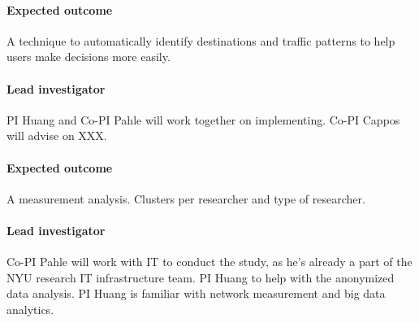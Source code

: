 \paragraph{Expected outcome} A technique to automatically identify destinations and traffic patterns to help users make decisions more easily.

\paragraph{Lead investigator} PI Huang and Co-PI Pahle will work together on implementing. Co-PI Cappos will advise on XXX.



\paragraph{Expected outcome} A measurement analysis. Clusters per researcher and type of researcher.

\paragraph{Lead investigator} Co-PI Pahle will work with IT to conduct the study, as he's already a part of the NYU research IT infrastructure team. PI Huang to help with the anonymized data analysis. PI Huang is familiar with network measurement and big data analytics.
